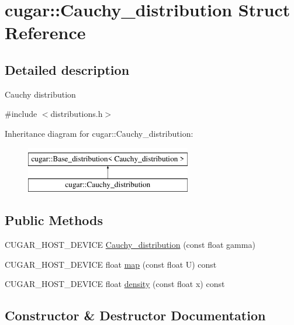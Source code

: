 \hypertarget{structcugar_1_1_cauchy__distribution}{}\section{cugar\+:\+:Cauchy\+\_\+distribution Struct Reference}
\label{structcugar_1_1_cauchy__distribution}


\subsection{Detailed description}
Cauchy distribution 

{\ttfamily \#include $<$distributions.\+h$>$}

Inheritance diagram for cugar\+:\+:Cauchy\+\_\+distribution\+:\begin{figure}[H]
\begin{center}
\leavevmode
\includegraphics[height=2.000000cm]{structcugar_1_1_cauchy__distribution}
\end{center}
\end{figure}
\subsection*{Public Methods}
\begin{DoxyCompactItemize}
\item 
C\+U\+G\+A\+R\+\_\+\+H\+O\+S\+T\+\_\+\+D\+E\+V\+I\+CE \hyperlink{structcugar_1_1_cauchy__distribution_a71de811a43d29f66b681c017c510b7b7}{Cauchy\+\_\+distribution} (const float gamma)
\item 
C\+U\+G\+A\+R\+\_\+\+H\+O\+S\+T\+\_\+\+D\+E\+V\+I\+CE float \hyperlink{structcugar_1_1_cauchy__distribution_a5ebb0dbebd02e247c4056c7c82466f8a}{map} (const float U) const
\item 
C\+U\+G\+A\+R\+\_\+\+H\+O\+S\+T\+\_\+\+D\+E\+V\+I\+CE float \hyperlink{structcugar_1_1_cauchy__distribution_ae4849f807e5ed3ca0557fa9b2bea4da6}{density} (const float x) const
\end{DoxyCompactItemize}


\subsection{Constructor \& Destructor Documentation}
\mbox{\label{structcugar_1_1_cauchy__distribution_a71de811a43d29f66b681c017c510b7b7}} 
